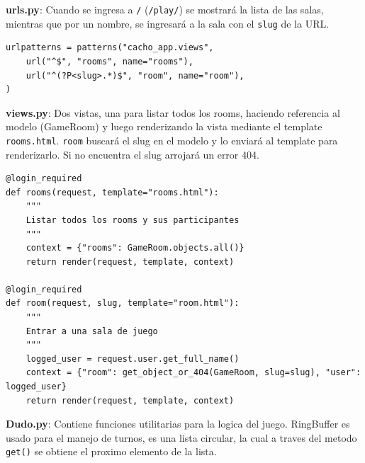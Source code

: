 \documentclass[a4paper,11pt]{article}
\begin{document}
\textbf{urls.py}: Cuando se ingresa a \texttt{/} (\texttt{/play/}) se mostrará
la lista de las salas, mientras que por un nombre, se ingresará a la sala con el
\texttt{slug} de la URL.
\begin{lstlisting}[caption=cacho\_app/urls.py]
urlpatterns = patterns("cacho_app.views",
	url("^$", "rooms", name="rooms"),
	url("^(?P<slug>.*)$", "room", name="room"),
)
\end{lstlisting}
\vspace{1cm}
\textbf{views.py}: Dos vistas, una para listar todos los rooms, haciendo
referencia al modelo (GameRoom) y luego renderizando la vista mediante el template
\texttt{rooms.html}. \texttt{room} buscará el slug en el modelo y lo enviará al template
para renderizarlo. Si no encuentra el slug arrojará un error 404.
\begin{lstlisting}[caption=cacho\_app/views.py]
@login_required
def rooms(request, template="rooms.html"):
    """
    Listar todos los rooms y sus participantes
    """
    context = {"rooms": GameRoom.objects.all()}
    return render(request, template, context)

@login_required
def room(request, slug, template="room.html"):
    """
    Entrar a una sala de juego
    """
    logged_user = request.user.get_full_name()
    context = {"room": get_object_or_404(GameRoom, slug=slug), "user": logged_user}
    return render(request, template, context)
\end{lstlisting}
\newpage
\textbf{Dudo.py}: Contiene funciones utilitarias para la logica del juego.
RingBuffer es usado para el manejo de turnos, es una lista circular, la cual a traves
del metodo \texttt{get()} se obtiene el proximo elemento de la lista.\\
\end{document}
